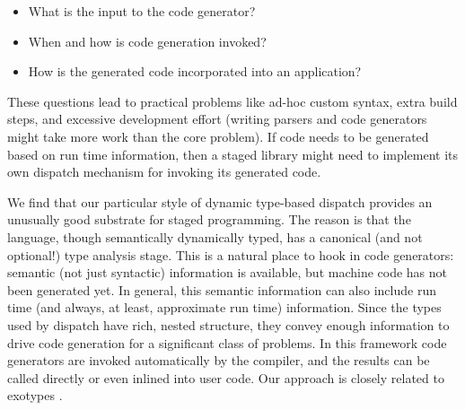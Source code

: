 \vspace{-3ex}
\begin{singlespace}
\begin{itemize}
\item What is the input to the code generator?
\item When and how is code generation invoked?
\item How is the generated code incorporated into an application?
\end{itemize}
\end{singlespace}

\noindent
These questions lead to practical problems like ad-hoc custom syntax,
extra build steps, and excessive development effort (writing parsers and
code generators might take more work than the core problem).
If code needs to be generated based on run time information, then a
staged library might need to implement its own dispatch mechanism
for invoking its generated code.

We find that our particular style of dynamic type-based dispatch provides
an unusually good substrate for staged programming.
The reason is that the language, though semantically dynamically typed,
has a canonical (and not optional!) type analysis stage.
This is a natural place to hook in code generators: semantic (not just
syntactic) information is available, but machine code has not been
generated yet.
In general, this semantic information can also include run time (and
always, at least, approximate run time) information.
Since the types used by dispatch have rich, nested structure, they
convey enough information to drive code generation for a significant
class of problems.
In this framework code generators are invoked automatically by
the compiler, and the results can be called directly or even inlined
into user code.
Our approach is closely related to exotypes
\cite{DeVito:2014:FRG:2594291.2594307}.




